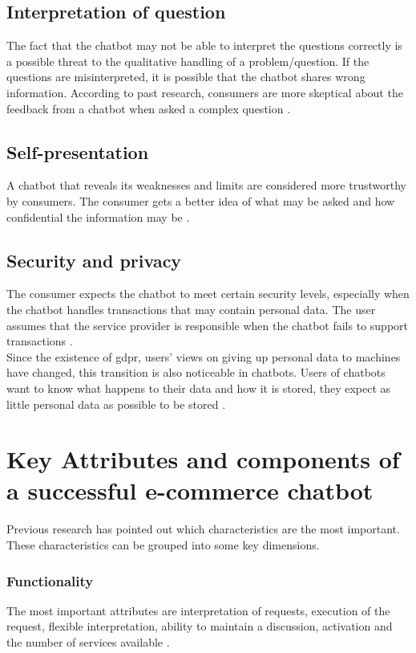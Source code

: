 \subsection{Interpretation of question}
The fact that the chatbot may not be able to interpret the questions correctly is a possible threat to the qualitative handling of a problem/question. If the questions are misinterpreted, it is possible that the chatbot shares wrong information. According to past research, consumers are more skeptical about the feedback from a chatbot when asked a complex question \citep*{Folstad2018,Nordheim2019}.\\

\subsection{Self-presentation}
A chatbot that reveals its weaknesses and limits are considered more trustworthy by consumers. The consumer gets a better idea of what may be asked and how confidential the information may be \citep{Folstad2018}.

\subsection{Security and privacy}
The consumer expects the chatbot to meet certain security levels, especially when the chatbot handles transactions that may contain personal data. The user assumes that the service provider is responsible when the chatbot fails to support transactions \citep*{Folstad2018, Nordheim2019}.\\
\break
Since the existence of \acrfull{gdpr}, users' views on giving up personal data to machines have changed, this transition is also noticeable in chatbots. Users of chatbots want to know what happens to their data and how it is stored, they expect as little personal data as possible to be stored \citep*{Folstad2018, Nordheim2019}. 


\section{Key Attributes and components of a successful e-commerce chatbot}
Previous research has pointed out which characteristics are the most important. These characteristics can be grouped into some key dimensions.\\

\subsubsection{Functionality}
The most important attributes are interpretation of requests, execution of the request, flexible interpretation, ability to maintain a discussion, activation and the number of services available \citep*{Muizzah2021, Verkeyn2018}.\\

